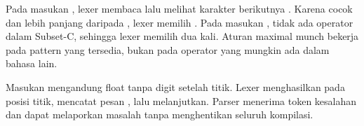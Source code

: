\begin{contoh}
Pada masukan , lexer membaca \code{<} lalu melihat
karakter berikutnya \code{=}. Karena \code{<=} cocok dan lebih
panjang daripada \code{<}, lexer memilih . Pada masukan
, tidak ada operator \code{<<} dalam Subset-C, sehingga
lexer memilih  dua kali. Aturan maximal munch bekerja pada
pattern yang tersedia, bukan pada operator yang mungkin ada dalam
bahasa lain.
\end{contoh}

\begin{contoh}
Masukan  mengandung float tanpa digit setelah
titik. Lexer menghasilkan  pada posisi titik,
mencatat pesan , lalu melanjutkan. Parser menerima token kesalahan dan dapat
melaporkan masalah tanpa menghentikan seluruh kompilasi.
\end{contoh}
